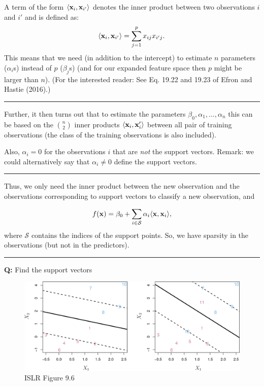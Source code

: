 \documentclass[]{article}
\begin{document}
A term of the form \(\langle {\bf x}_i, {\bf x}_{i'} \rangle\) denotes
the inner product between two observations \(i\) and \(i'\) and is
defined as: \[
\langle {\bf x}_i , {\bf x}_{i'}\rangle =\sum_{j=1}^p x_{ij} x_{i' j}.
\] This means that we need (in addition to the intercept) to estimate
\(n\) parameters (\(\alpha_i\)s) instead of \(p\) (\(\beta_j\)s) (and
for our expanded feature space then \(p\) might be larger than \(n\)).
(For the interested reader: See Eq. 19.22 and 19.23 of Efron and Hastie
(2016).)

\begin{center}\rule{0.5\linewidth}{\linethickness}\end{center}

Further, it then turns out that to estimate the parameters
\(\beta_0,\alpha_1,...,\alpha_n\) this can be based on the
\({n}\choose{2}\) inner products \(\langle {\bf x}_i,{\bf x}_i'\rangle\)
between all pair of training observations (the class of the training
observations is also included).

Also, \(\alpha_i=0\) for the observations \(i\) that are \emph{not} the
support vectors. Remark: we could alternatively say that
\(\alpha_i \neq 0\) define the support vectors.

\begin{center}\rule{0.5\linewidth}{\linethickness}\end{center}

Thus, we only need the inner product between the new observation and the
observations corresponding to support vectors to classify a new
observation, and

\[
f({\bf x})=\beta_0 + \sum_{i \in \mathcal{S}} \alpha_i \langle {\bf x}, {\bf x}_i\rangle,
\] where \(\mathcal{S}\) contains the indices of the support points. So,
we have sparsity in the observations (but not in the predictors).

\begin{center}\rule{0.5\linewidth}{\linethickness}\end{center}

\textbf{Q:} Find the support vectors

\begin{figure}
\centering
\includegraphics{../ISLR/Chapter9/9.6.png}
\caption{ISLR Figure 9.6}
\end{figure}
\end{document}
